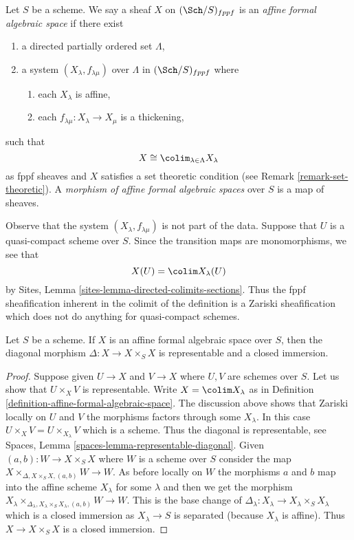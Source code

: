 \begin{definition}
\label{definition-affine-formal-algebraic-space}
Let $S$ be a scheme. We say a sheaf $X$ on $(\Sch/S)_{fppf}$ is an
{\it affine formal algebraic space} if there exist
\begin{enumerate}
\item a directed partially ordered set $\Lambda$,
\item a system $(X_\lambda, f_{\lambda \mu})$ over $\Lambda$
in $(\Sch/S)_{fppf}$ where
\begin{enumerate}
\item each $X_\lambda$ is affine,
\item each $f_{\lambda \mu} : X_\lambda \to X_\mu$ is a thickening,
\end{enumerate}
\end{enumerate}
such that
$$
X \cong \colim_{\lambda \in \Lambda} X_\lambda
$$
as fppf sheaves and $X$ satisfies a set theoretic condition
(see Remark \ref{remark-set-theoretic}). A
{\it morphism of affine formal algebraic spaces}
over $S$ is a map of sheaves.
\end{definition}

\noindent
Observe that the system $(X_\lambda, f_{\lambda \mu})$ is not
part of the data. Suppose that $U$ is a quasi-compact scheme over $S$.
Since the transition maps are monomorphisms, we see that
$$
X(U) = \colim X_\lambda(U)
$$
by Sites, Lemma \ref{sites-lemma-directed-colimits-sections}.
Thus the fppf sheafification inherent in the colimit of the
definition is a Zariski sheafification which does not do
anything for quasi-compact schemes.

\begin{lemma}
\label{lemma-diagonal-affine-formal-algebraic-space}
Let $S$ be a scheme. If $X$ is an affine formal algebraic space over
$S$, then the diagonal morphism $\Delta : X \to X \times_S X$
is representable and a closed immersion.
\end{lemma}

\begin{proof}
Suppose given $U \to X$ and $V \to X$ where $U, V$ are schemes over $S$.
Let us show that $U \times_X V$ is representable. Write $X = \colim X_\lambda$
as in Definition \ref{definition-affine-formal-algebraic-space}.
The discussion above shows that Zariski locally on $U$ and $V$ the morphisms
factors through some $X_\lambda$. In this case
$U \times_X V = U \times_{X_\lambda} V$ which is a scheme.
Thus the diagonal is representable, see
Spaces, Lemma \ref{spaces-lemma-representable-diagonal}.
Given $(a, b) : W \to X \times_S X$ where $W$ is a scheme over $S$
consider the map $X \times_{\Delta, X \times_S X, (a, b)} W \to W$.
As before locally on $W$ the morphisms $a$ and $b$ map into
the affine scheme $X_\lambda$ for some $\lambda$ and then
we get the morphism
$X_\lambda
\times_{\Delta_\lambda, X_\lambda \times_S X_\lambda, (a, b)} W \to W$.
This is the base change of
$\Delta_\lambda : X_\lambda \to X_\lambda \times_S X_\lambda$
which is a closed immersion as $X_\lambda \to S$ is separated
(because $X_\lambda$ is affine).
Thus $X \to X \times_S X$ is a closed immersion.
\end{proof}

